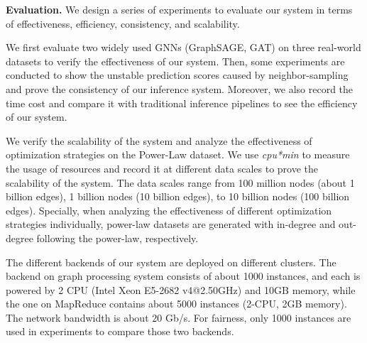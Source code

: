 \documentclass[conference]{IEEEtran}
\begin{document}
\textbf{Evaluation.}
We design a series of experiments to evaluate our system in terms of effectiveness, efficiency, consistency, and scalability.

We first evaluate two widely used GNNs (GraphSAGE\cite{b4}, GAT\cite{b3}) on three real-world datasets to verify the effectiveness of our system.
Then, some experiments are conducted to show the unstable prediction scores caused by neighbor-sampling and prove the consistency of our inference system.
Moreover, we also record the time cost and compare it with traditional inference pipelines to see the efficiency of our system.


We verify the scalability of the system and analyze the effectiveness of optimization strategies on the Power-Law dataset.
We use \emph{cpu*min} to measure the usage of resources and record it at different data scales to prove the scalability of the system.
The data scales range from 100 million nodes (about 1 billion edges), 1 billion nodes (10 billion edges), to 10 billion nodes (100 billion edges). %
Specially, when analyzing the effectiveness of different optimization strategies individually,  power-law datasets are generated  with in-degree and out-degree following the power-law, respectively. 

The different backends of our system are deployed on different clusters. 
The backend on graph processing system consists of about 1000 instances, and each is powered by 2 CPU (Intel Xeon E5-2682 v4@2.50GHz) and 10GB memory, while the one on MapReduce contains about 5000 instances  (2-CPU, 2GB memory).
The network bandwidth is about 20 Gb/s.
For fairness, only 1000 instances are used in experiments to compare those two backends.
\end{document}
